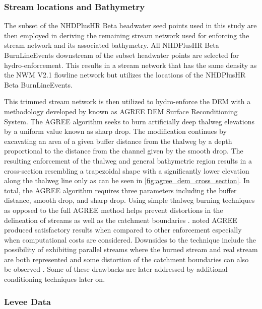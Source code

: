 \subsubsection{Stream locations and Bathymetry}

The subset of the NHDPlusHR Beta headwater seed points used in this study are then employed in deriving the remaining stream network used for enforcing the stream network and its associated bathymetry. 
All NHDPlusHR Beta BurnLineEvents downstream of the subset headwater points are selected for hydro-enforcement. 
This results in a stream network that has the same density as the NWM V2.1 flowline network but utilizes the locations of the NHDPlusHR Beta BurnLineEvents. 

This trimmed stream network is then utilized to hydro-enforce the DEM with a methodology developed by  known as AGREE DEM Surface Reconditioning System. 
The AGREE algorithm seeks to burn artificially deep thalweg elevations by a uniform value known as sharp drop. 
The modification continues by excavating an area of a given buffer distance from the thalweg by a depth proportional to the distance from the channel given by the smooth drop. 
The resulting enforcement of the thalweg and general bathymetric region results in a cross-section resembling a trapezoidal shape with a significantly lower elevation along the thalweg line only as can be seen in \ref{fig:agree_dem_cross_section}.
In total, the AGREE algorithm requires three parameters including the buffer distance, smooth drop, and sharp drop. 
Using simple thalweg burning techniques as opposed to the full AGREE method helps prevent distortions in the delineation of streams as well as the catchment boundaries \cite{saunders1995grid,saunders1996gis,mizgalewicz1996modeling,hellweger1997agree,quenzer1998gis,baker2006comparison}.
 noted AGREE produced satisfactory results when compared to other enforcement especially when computational costs are considered. 
Downsides to the technique include the possibility of exhibiting parallel streams where the burned stream and real stream are both represented \cite{hellweger1997agree,saunders1999preparation} and some distortion of the catchment boundaries can also be observed \cite{saunders1999preparation,saunders1996gis}. Some of these drawbacks are later addressed by additional conditioning techniques later on.

\subsubsection{Levee Data}

